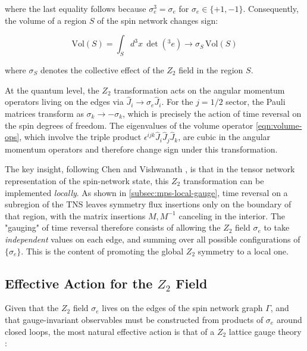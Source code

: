 where the last equality follows because \(\sigma_e^3 = \sigma_e\) for \(\sigma_e \in \{+1, -1\}\). Consequently, the volume of a region \(S\) of the spin network changes sign:

\begin{equation}\label{eqn:z2-volume-flip}
  \text{Vol}(S) = \int_S d^3 x \, \det({}^3 e) \rightarrow \sigma_S \, \text{Vol}(S)
\end{equation}

where \(\sigma_S\) denotes the collective effect of the \(Z_2\) field in the region \(S\).

At the quantum level, the \(Z_2\) transformation acts on the angular momentum operators living on the edges via \(\hat J_i \rightarrow \sigma_e \hat J_i\). For the \(j = 1/2\) sector, the Pauli matrices transform as \(\sigma_k \rightarrow -\sigma_k\), which is precisely the action of time reversal on the spin degrees of freedom. The eigenvalues of the volume operator \eqref{eqn:volume-ops}, which involve the triple product \(\epsilon^{ijk} \hat J_i \hat J_j \hat J_k\), are cubic in the angular momentum operators and therefore change sign under this transformation.

The key insight, following Chen and Vishwanath \cite{Chen2015Gauging}, is that in the tensor network representation of the spin-network state, this \(Z_2\) transformation can be implemented \emph{locally}. As shown in \autoref{subsec:mps-local-gauge}, time reversal on a subregion of the TNS leaves symmetry flux insertions only on the boundary of that region, with the matrix insertions \(M, M^{-1}\) canceling in the interior. The "gauging" of time reversal therefore consists of allowing the \(Z_2\) field \(\sigma_e\) to take \emph{independent} values on each edge, and summing over all possible configurations of \(\{\sigma_e\}\). This is the content of promoting the global \(Z_2\) symmetry to a local one.

\subsection{\texorpdfstring{Effective Action for the \(Z_2\) Field}{Effective Action for the Z\_2 Field}}\label{subsec:z2-effective-action}

Given that the \(Z_2\) field \(\sigma_e\) lives on the edges of the spin network graph \(\Gamma\), and that gauge-invariant observables must be constructed from products of \(\sigma_e\) around closed loops, the most natural effective action is that of a \(Z_2\) lattice gauge theory \cite{Wegner1971Duality,Kogut1979An-introduction}:


